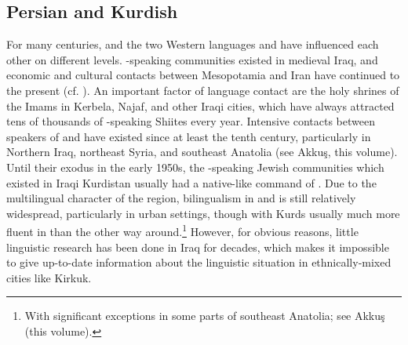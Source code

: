 \documentclass[output=paper]{langsci/langscibook}
\begin{document}
  \subsection{Persian and Kurdish} \label{persian} 
For many centuries,  and the two Western  languages  and  have influenced each other on different levels. -speaking communities existed in medieval Iraq, and economic and cultural contacts between Mesopotamia and Iran have continued to the present (cf. \citealt{Gazsi2011}). An important factor of language contact are the holy shrines of the Imams in Kerbela, Najaf, and other Iraqi cities, which have always attracted tens of thousands of -speaking Shiites every year. Intensive contacts between speakers of  and  have existed since at least the tenth century, particularly in {Northern} Iraq, northeast Syria, and southeast {Anatolia} (see Akkuş, this volume). Until their exodus in the early 1950s, the -speaking Jewish communities which existed in Iraqi Kurdistan usually had a native-like command of  \citep[12]{Jastrow1990chapter}. Due to the multilingual character of the region, {bilingualism} in  and  is still relatively widespread, particularly in urban settings, though with {Kurds} usually much more fluent in  than the other way around.\footnote{With significant exceptions in some parts of southeast {Anatolia}; see Akkuş (this volume).} However, for obvious reasons, little linguistic research has been done in Iraq for decades, which makes it impossible to give up-to-date information about the linguistic situation in ethnically-mixed cities like Kirkuk.
\end{document}

